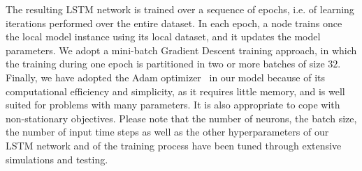 \documentclass[conference]{IEEEtran}
\begin{document}
The resulting LSTM network is trained over a sequence of epochs, i.e. of learning iterations performed over the entire dataset. In each epoch, a node trains once the local model instance using its local dataset, and it updates the model parameters. We adopt a mini-batch Gradient Descent training approach, in which the training during one epoch is  partitioned in two or more batches of size $32$. Finally, we have adopted the Adam optimizer~\cite{kingma2014adam} in our model because of its computational efficiency and simplicity, as it requires little memory, and is well suited for problems with many parameters. It is also appropriate to cope with non-stationary objectives.
Please note that the number of neurons, the batch size, the number of input time steps as well as the other hyperparameters of our LSTM network and of the training process have been tuned through extensive simulations and testing.
\vspace{-0.1in}
\end{document}
